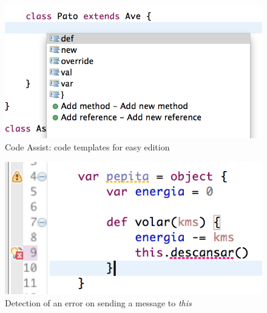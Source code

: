 	\begin{figure}[p]
	    \centering
		\includegraphics[scale=0.5]{images/wollok-paper-codetemplates.png}
	    \caption{Code Assist: code templates for easy edition}
	    \label{fig:codetemplates.png}
	\end{figure}

	\begin{figure}[p]
	    \centering
		\includegraphics[scale=0.5]{images/wollok-paper-check-noMethodOnThis.png}
	    \caption{Detection of an error on sending a message to \emph{this}}
	    \label{fig:check-noMethodOnThis.png}
	\end{figure}


